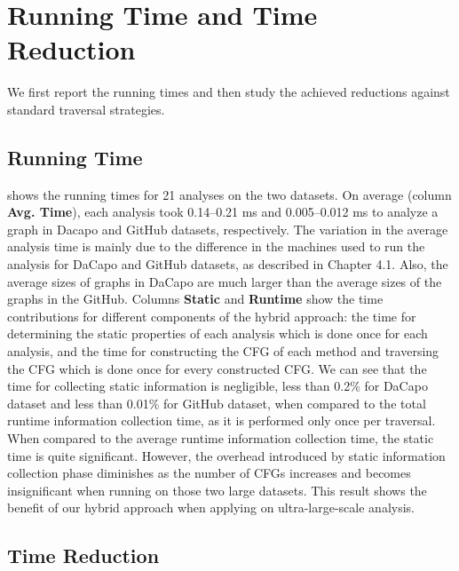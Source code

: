 \chapter{Running Time and Time Reduction}
\label{sec:performance-gain}

We first report the running times and then study the achieved reductions against standard traversal strategies. 

\section{Running Time}

 shows the running times for 21 analyses on the two 
datasets. On average (column \textbf{Avg. Time}), each analysis took 
0.14--0.21 ms and 0.005--0.012 ms to analyze a graph in Dacapo and GitHub 
datasets, respectively. The variation in the average analysis time is 
mainly due to the difference in the machines used to run the analysis for 
DaCapo and GitHub datasets, as described in Chapter 4.1. Also, the average 
sizes of graphs in DaCapo are much larger than the average sizes of the graphs in the GitHub.
%
Columns \textbf{Static} and \textbf{Runtime} show the time contributions for 
different components of the hybrid approach: the time for determining the 
static properties of each analysis which is done once for each analysis, and 
the time for constructing the CFG of each method and traversing the CFG which 
is done once for every constructed CFG. 
We can see that the time for collecting static information is negligible, 
less than 0.2\% for DaCapo dataset and less than 0.01\% for GitHub 
dataset, when compared to the total runtime information collection time, as it is performed only 
once per traversal. When compared to the average runtime information collection time, the static 
time is quite significant. However, the overhead introduced by static 
information collection phase diminishes as the number of CFGs increases and 
becomes insignificant when running on those two large datasets. This result 
shows the benefit of our hybrid approach when applying on ultra-large-scale
analysis.

\section{Time Reduction}

